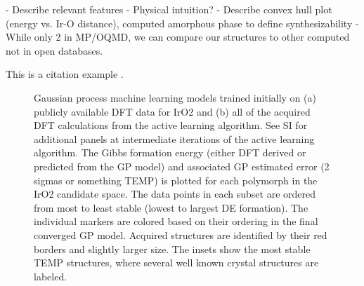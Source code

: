 

- Describe relevant features
  - Physical intuition?
- Describe convex hull plot (energy vs. Ir-O distance), computed amorphous phase to define synthesizability
- While only 2  in MP/OQMD, we can compare our structures to other computed  not in open databases.


This is a citation example \cite{dummy9999}.

\begin{figure}
\centering
{}
\caption{\label{fig:convergence_plot_iro2_0}
Gaussian process machine learning models trained initially on (a) publicly available DFT data for IrO2 and (b) all of the acquired DFT calculations from the active learning algorithm.
See SI for additional panels at intermediate iterations of the active learning algorithm.
The Gibbs formation energy (either DFT derived or predicted from the GP model) and associated GP estimated error (2 sigmas or something TEMP) is plotted for each polymorph in the IrO2 candidate space.
The data points in each subset are ordered from most to least stable (lowest to largest DE formation).
The individual markers are colored based on their ordering in the final converged GP model.
Acquired structures are identified by their red borders and slightly larger size.
The insets show the most stable TEMP structures, where several well known crystal structures are labeled.
}
\end{figure}


